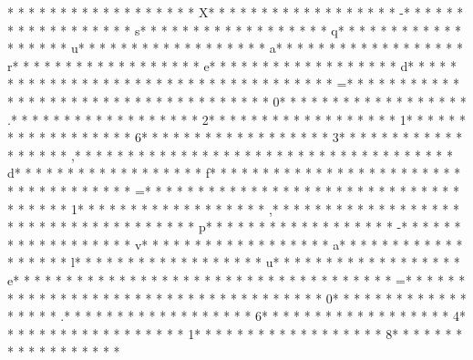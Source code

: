 * * *  * * *  * * *  *  * * *  *  * * *  * X* * *  * * *  * * *  *  * * *  *  * * *  * -* * *  * * *  * * *  *  * * *  *  * * *  * s* * *  * * *  * * *  *  * * *  *  * * *  * q* * *  * * *  * * *  *  * * *  *  * * *  * u* * *  * * *  * * *  *  * * *  *  * * *  * a* * *  * * *  * * *  *  * * *  *  * * *  * r* * *  * * *  * * *  *  * * *  *  * * *  * e* * *  * * *  * * *  *  * * *  *  * * *  * d* * *  * * *  * * *  *  * * *  *  * * *  *  * * *  * * *  * * *  *  * * *  *  * * *  * =* * *  * * *  * * *  *  * * *  *  * * *  *  * * *  * * *  * * *  *  * * *  *  * * *  * 0* * *  * * *  * * *  *  * * *  *  * * *  * .* * *  * * *  * * *  *  * * *  *  * * *  * 2* * *  * * *  * * *  *  * * *  *  * * *  * 1* * *  * * *  * * *  *  * * *  *  * * *  * 6* * *  * * *  * * *  *  * * *  *  * * *  * 3* * *  * * *  * * *  *  * * *  *  * * *  * ,* * *  * * *  * * *  *  * * *  *  * * *  *  * * *  * * *  * * *  *  * * *  *  * * *  * d* * *  * * *  * * *  *  * * *  *  * * *  * f* * *  * * *  * * *  *  * * *  *  * * *  *  * * *  * * *  * * *  *  * * *  *  * * *  * =* * *  * * *  * * *  *  * * *  *  * * *  *  * * *  * * *  * * *  *  * * *  *  * * *  * 1* * *  * * *  * * *  *  * * *  *  * * *  * ,* * *  * * *  * * *  *  * * *  *  * * *  *  * * *  * * *  * * *  *  * * *  *  * * *  * p* * *  * * *  * * *  *  * * *  *  * * *  * -* * *  * * *  * * *  *  * * *  *  * * *  * v* * *  * * *  * * *  *  * * *  *  * * *  * a* * *  * * *  * * *  *  * * *  *  * * *  * l* * *  * * *  * * *  *  * * *  *  * * *  * u* * *  * * *  * * *  *  * * *  *  * * *  * e* * *  * * *  * * *  *  * * *  *  * * *  *  * * *  * * *  * * *  *  * * *  *  * * *  * =* * *  * * *  * * *  *  * * *  *  * * *  *  * * *  * * *  * * *  *  * * *  *  * * *  * 0* * *  * * *  * * *  *  * * *  *  * * *  * .* * *  * * *  * * *  *  * * *  *  * * *  * 6* * *  * * *  * * *  *  * * *  *  * * *  * 4* * *  * * *  * * *  *  * * *  *  * * *  * 1* * *  * * *  * * *  *  * * *  *  * * *  * 8* * *  * * *  * * *  *  * * *  *  * * *  * 
